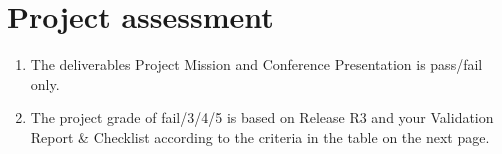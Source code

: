 \section{Project assessment}
\begin{enumerate}
\item The deliverables Project Mission and Conference Presentation is pass/fail only.
\item The project grade of fail/3/4/5 is based on Release R3 and your Validation Report \& Checklist according to the criteria in the table on the next page.

\end{enumerate}

\newpage

  ~ \newpage ~

\begin{adjustbox}{width=1.0\textwidth}

\end{adjustbox}
